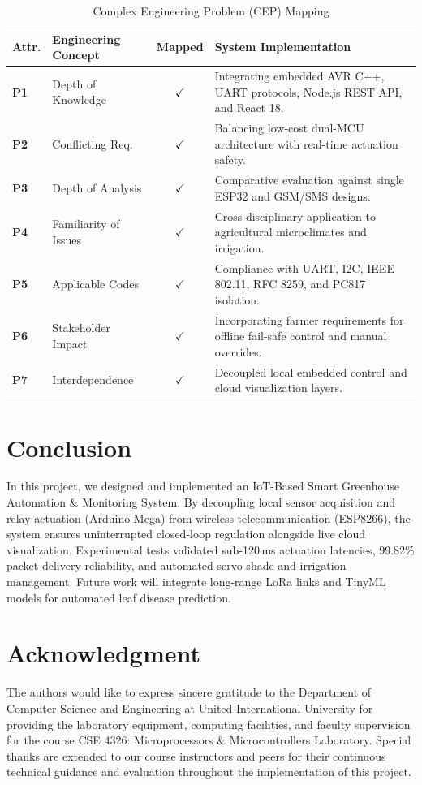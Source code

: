 \documentclass[conference]{IEEEtran}
\begin{document}
\begin{table}[htbp]
\caption{Complex Engineering Problem (CEP) Mapping}
\label{tab:cep}
\centering
\begin{tabularx}{\columnwidth}{l p{2.2cm} c X}
\toprule
\textbf{Attr.} & \textbf{Engineering Concept} & \textbf{Mapped} & \textbf{System Implementation} \\
\midrule
\textbf{P1} & Depth of Knowledge & $\checkmark$ & Integrating embedded AVR C++, UART protocols, Node.js REST API, and React 18. \\
\textbf{P2} & Conflicting Req. & $\checkmark$ & Balancing low-cost dual-MCU architecture with real-time actuation safety. \\
\textbf{P3} & Depth of Analysis & $\checkmark$ & Comparative evaluation against single ESP32 and GSM/SMS designs. \\
\textbf{P4} & Familiarity of Issues & $\checkmark$ & Cross-disciplinary application to agricultural microclimates and irrigation. \\
\textbf{P5} & Applicable Codes & $\checkmark$ & Compliance with UART, I2C, IEEE 802.11, RFC 8259, and PC817 isolation. \\
\textbf{P6} & Stakeholder Impact & $\checkmark$ & Incorporating farmer requirements for offline fail-safe control and manual overrides. \\
\textbf{P7} & Interdependence & $\checkmark$ & Decoupled local embedded control and cloud visualization layers. \\
\bottomrule
\end{tabularx}
\end{table}

\section{Conclusion}
In this project, we designed and implemented an IoT-Based Smart Greenhouse Automation \& Monitoring System. By decoupling local sensor acquisition and relay actuation (Arduino Mega) from wireless telecommunication (ESP8266), the system ensures uninterrupted closed-loop regulation alongside live cloud visualization. Experimental tests validated sub-120\,ms actuation latencies, 99.82\% packet delivery reliability, and automated servo shade and irrigation management. Future work will integrate long-range LoRa links and TinyML models for automated leaf disease prediction.

\section*{Acknowledgment}
The authors would like to express sincere gratitude to the Department of Computer Science and Engineering at United International University for providing the laboratory equipment, computing facilities, and faculty supervision for the course CSE 4326: Microprocessors \& Microcontrollers Laboratory. Special thanks are extended to our course instructors and peers for their continuous technical guidance and evaluation throughout the implementation of this project.
\end{document}
